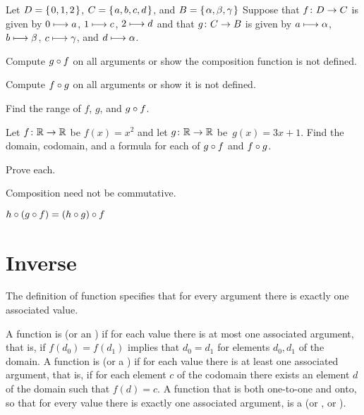 \documentclass{ibl}
\begin{document}
\begin{ex} Let $D=\mbox{$\{\hspace{0.1em}0,1,2\hspace{0.1em}\}$}$, $C=\mbox{$\{\hspace{0.1em}a,b,c,d\hspace{0.1em}\}$}$, 
and $B=\mbox{$\{\hspace{0.1em}\alpha,\beta,\gamma\hspace{0.1em}\}$}$
Suppose that $\mbox{$f\colon D\to C$}$ is given by $0\stackrel{}{\longmapsto} a$, $1\stackrel{}{\longmapsto} c$, 
$2\stackrel{}{\longmapsto} d$ and that $\mbox{$g\colon C\to B$}$
is given by 
$a\stackrel{}{\longmapsto}\alpha$, $b\stackrel{}{\longmapsto} \beta$, $c\stackrel{}{\longmapsto}\gamma$,
and $d\stackrel{}{\longmapsto}\alpha$.
\begin{exes}
\item Compute $g\mathbin{\circ} f$ on all arguments or show the composition
  function is not defined.
\item Compute $f\mathbin{\circ} g$ on all arguments or show it is not defined.
\item Find the range of $f$, $g$, and $g\mathbin{\circ} f$.    
\end{exes}
\end{ex}

\begin{ex}
Let $\mbox{$f\colon \mathbb{R}\to \mathbb{R}$}$ be $f(x)=x^2$ and let $\mbox{$g\colon \mathbb{R}\to \mathbb{R}$}$ be~$g(x)=3x+1$.
Find the domain, codomain, and a formula for each of
$g\mathbin{\circ} f$ and $f\mathbin{\circ} g$.  
\end{ex}

\begin{ex}Prove each.
\begin{exes}
\item Composition need not be commutative.
\item{} 
  $h\mathbin{\circ} (g\mathbin{\circ} f)=(h\mathbin{\circ} g)\mathbin{\circ} f$    
\end{exes}
\end{ex}





\section{Inverse}

The definition of function specifies that for every argument there is 
exactly one associated value.

\begin{df}
A function is  (or an ) 
if for each value there is at most
one associated argument, that is, if $f(d_0)=f(d_1)$ implies that $d_0=d_1$
for elements $d_0,d_1$ of the domain.
A function is  (or a ) 
if for each value there is at least
one associated argument, that is, if for each element $c$ of the codomain
there exists an element $d$ of the domain such that $f(d)=c$.
A function that is both one-to-one and onto, so that for every value there
is exactly one associated argument, is a 
 (or , or ).
\end{df}
\end{document}
